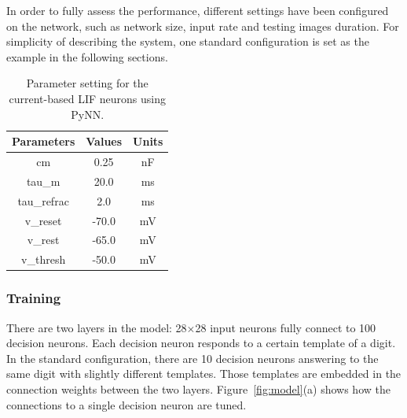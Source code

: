 \documentclass{frontiersENG} %
\begin{document}
In order to fully assess the performance, different settings have been configured on the network, such as network size, input rate and testing images duration.
For simplicity of describing the system, one standard configuration is set as the example in the following sections.
\begin{table}[hbbp]
	\centering
	\caption{\label{tbl:pynnSetting}Parameter setting for the current-based LIF neurons using PyNN.}
	\bgroup
	\def\arraystretch{1.1}
	\begin{tabular}{c|c|c}
		Parameters & Values & Units \\
		\hline
		cm & 0.25 & nF	\\
		tau\_m & 20.0 & ms\\
		tau\_refrac & 2.0 & ms\\
		v\_reset & -70.0 & mV\\
		v\_rest & -65.0 & mV\\
		v\_thresh & -50.0 & mV\\
	\end{tabular}
	\egroup
\end{table}

\subsubsection{Training}
There are two layers in the model: 28$\times$28 input neurons fully connect to 100 decision neurons.
Each decision neuron responds to a certain template of a digit.
In the standard configuration, there are 10 decision neurons answering to the same digit with slightly different templates.
Those templates are embedded in the connection weights between the two layers.
Figure~\ref{fig:model}(a) shows how the connections to a single decision neuron are tuned.
\end{document}

